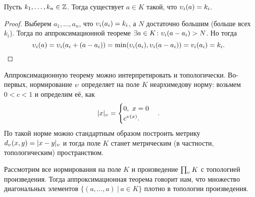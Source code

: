	\begin{corollary}\label{ant_2_corol_1}
		Пусть $k_1, \ldots, k_n \in \mathbb{Z}$. Тогда существует $a \in K$ такой, что $\upsilon_i(a) = k_i$.
	\end{corollary}
	\begin{proof}
		Выберем $a_1, \ldots, a_n$, что $\upsilon_i(a_i) = k_i$, а $N$ достаточно большим (больше всех $k_i$). Тогда по аппроксимационной теореме $\exists a \in K \colon \upsilon_i(a - a_i) > N$. 
		Но тогда 
		\[ 
			\upsilon_i(a) = \upsilon_i(a_i + (a - a_i)) = \min(\upsilon_i(a_i), \upsilon_i(a - a_i)) = v_i(a_i) = k_i.
		\]
	\end{proof}

	Аппроксимационную теорему можно интерпретировать и топологически. Во-первых, нормирование $\upsilon$ определяет на поле $K$ неархимедову норму: возьмем $0 < c < 1$ и определим её, как 
	\[
		|x|_{\upsilon} = \begin{cases} 0, \ x = 0 \\ c^{\upsilon(x)}.  \end{cases}.
	\]
	По такой норме можно стандартным образом построить метрику $d_{\upsilon}(x, y) = |x - y|_{\upsilon}$ и тогда поле $K$ станет метрическим (в частности, топологическим) пространством. 

	\begin{corollary}\label{ant_2_corol_2}
		Рассмотрим все нормирования на поле $K$ и произведение $\prod_{\upsilon} K $ с топологией произведения. Тогда аппроксимационная теорема говорит нам, что множество диагональных элементов $\{ (a, \ldots, a) \ \vert \ a \in K \}$ плотно в топологии произведения. 
		
	\end{corollary}

